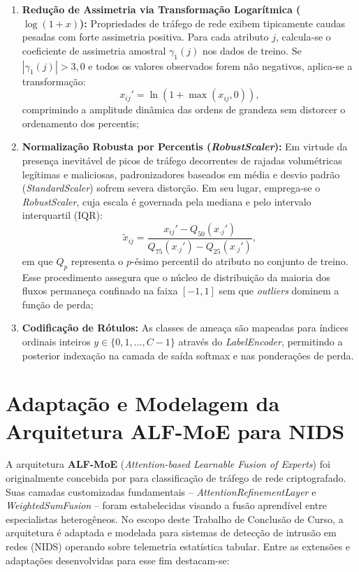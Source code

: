 \begin{enumerate}
    \item \textbf{Redução de Assimetria via Transformação Logarítmica ($\log(1+x)$):}
    Propriedades de tráfego de rede exibem tipicamente caudas pesadas com forte assimetria positiva. Para cada atributo 
    $j$, calcula-se o coeficiente de assimetria amostral $\gamma_1(j)$ nos dados de treino. Se $|\gamma_1(j)| > 3{,}0$ 
    e todos os valores observados forem não negativos, aplica-se a transformação:
    \begin{equation}
    \label{eq:log1p}
    x_{ij}' = \ln(1 + \max(x_{ij}, 0)),
    \end{equation}
    comprimindo a amplitude dinâmica das ordens de grandeza sem distorcer o ordenamento dos percentis;
    
    \item \textbf{Normalização Robusta por Percentis (\emph{RobustScaler}):}
    Em virtude da presença inevitável de picos de tráfego decorrentes de rajadas volumétricas legítimas e maliciosas, 
    padronizadores baseados em média e desvio padrão (\emph{StandardScaler}) sofrem severa distorção. Em seu lugar, 
    emprega-se o \emph{RobustScaler}, cuja escala é governada pela mediana e pelo intervalo interquartil 
    ($\mathrm{IQR}$):
    \begin{equation}
    \label{eq:robust_scaler}
    \tilde{x}_{ij} = \frac{x_{ij}' - Q_{50}(x_{\cdot j}')}{Q_{75}(x_{\cdot j}') - Q_{25}(x_{\cdot j}')},
    \end{equation}
    em que $Q_p$ representa o $p$-ésimo percentil do atributo no conjunto de treino. Esse procedimento assegura que o 
    núcleo de distribuição da maioria dos fluxos permaneça confinado na faixa $[-1, 1]$ sem que \emph{outliers} dominem 
    a função de perda;
    
    \item \textbf{Codificação de Rótulos:}
    As classes de ameaça são mapeadas para índices ordinais inteiros $y \in \{0, 1, \dots, C-1\}$ através do 
    \emph{LabelEncoder}, permitindo a posterior indexação na camada de saída softmax e nas ponderações de perda.
\end{enumerate}


\section{Adaptação e Modelagem da Arquitetura ALF-MoE para NIDS}
\label{sec:adaptacao_arquitetura}

A arquitetura \textbf{ALF-MoE} (\emph{Attention-based Learnable Fusion of Experts}) foi originalmente concebida por 
 para classificação de tráfego de rede criptografado. Suas camadas customizadas fundamentais -- 
\emph{AttentionRefinementLayer} e \emph{WeightedSumFusion} -- foram estabelecidas visando a fusão aprendível entre 
especialistas heterogêneos. No escopo deste Trabalho de Conclusão de Curso, a arquitetura é adaptada e modelada para 
sistemas de detecção de intrusão em redes (NIDS) operando sobre telemetria estatística tabular. Entre as extensões e 
adaptações desenvolvidas para esse fim destacam-se:

